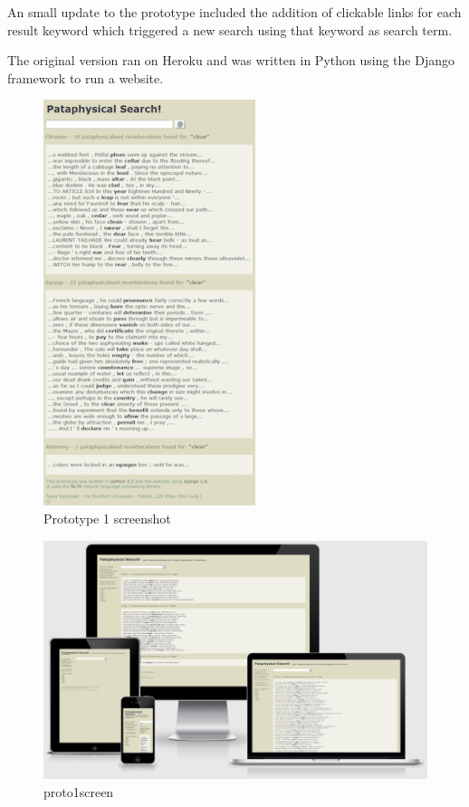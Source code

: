 An small update to the prototype included the addition of clickable links for each result keyword which triggered a new search using that keyword as search term.

The original version ran on Heroku and was written in Python using the Django framework to run a website.


\begin{figure}[htbp] %
  \centering
  \includegraphics[height=0.6\textheight]{images/prototype01}
\caption[Prototype 1 screenshot]{Prototype 1 screenshot}
\label{img:Prototype1x}
\end{figure}

\begin{figure}[htb] %
  \centering
  \includegraphics[width=\linewidth]{images/proto1screen}
\caption[proto1screen]{proto1screen}
\label{img:proto1screen}
\end{figure}

